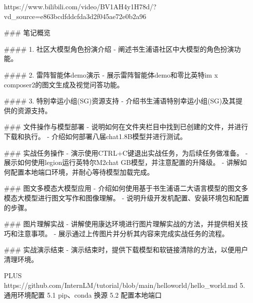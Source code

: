 https://www.bilibili.com/video/BV1AH4y1H78d/?vd_source=e863bcdfddcfda3d2f045ae72e0b2a96

### 笔记概览

#### 1. 社区大模型角色扮演介绍
- 阐述书生浦语社区中大模型的角色扮演功能。

#### 2. 雷阵智能体demo演示
- 展示雷阵智能体demo和零比英特im x composer2的图文生成及视觉问答功能。

#### 3. 特别幸运小组(SG)资源支持
- 介绍书生浦语特别幸运小组(SG)及其提供的资源支持。

### 文件操作与模型部署
- 说明如何在文件夹栏目中找到已创建的文件，并进行下载和执行。
- 介绍如何部署八届chat1.8B模型并进行测试。

### 实战任务操作
- 演示使用CTRL+C键退出实战任务，为后续任务做准备。
- 展示如何使用legion运行英特尔M2chat GB模型，并注意配置的升降级。
- 讲解如何配置本地端口环境，并耐心等待模型加载完成。

### 图文多模态大模型应用
- 介绍如何使用基于书生浦语二大语言模型的图文多模态大模型进行图文写作和图像理解。
- 说明升级开发机配置、安装环境包和配置的步骤。

### 图片理解实战
- 讲解使用康达环境进行图片理解实战的方法，并提供相关技巧和注意事项。
- 展示通过上传图片并分析其内容来完成实战任务的流程。

### 实战演示结束
- 演示结束时，提供下载模型和软链接清除的方法，以便用户清理环境。

PLUS
https://github.com/InternLM/tutorial/blob/main/helloworld/hello_world.md
5. 通用环境配置
5.1 pip、conda 换源
5.2 配置本地端口
